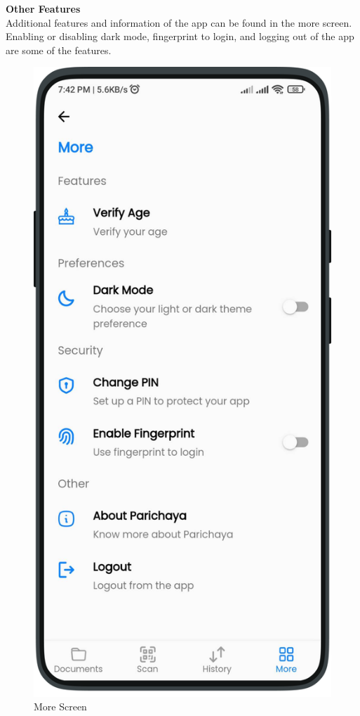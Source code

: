         \textbf{Other Features}\\
        Additional features and information of the app can be found in the more screen. Enabling or disabling dark mode, fingerprint to login, and logging out of the app are some of the features. 
        \begin{multicols}{2}
            \begin{figure}[H]
            \centering
            \includegraphics[width=0.6\linewidth]{images/results/mobile/More.png}
            \caption[More screen]{More Screen}
            \label{fig:More.png}
            \end{figure}     
            \begin{figure}[H]
            \centering

\end{figure}
\end{multicols}
